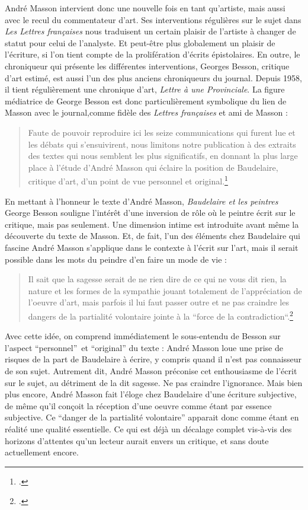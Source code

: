 	 André Masson intervient donc une nouvelle fois en tant qu’artiste, mais aussi avec le recul du commentateur d’art. Ses interventions régulières sur le sujet dans \emph{Les Lettres françaises} nous traduisent un certain plaisir de l’artiste à changer de statut pour celui de l’analyste. Et peut-être plus globalement un plaisir de l’écriture, si l’on tient compte de la prolifération d’écrits épistolaires. En outre, le chroniqueur qui présente les différentes interventions, Georges Besson, critique d’art estimé, est aussi l’un des plus anciens chroniqueurs du journal. Depuis 1958, il tient régulièrement une chronique d’art, \emph{Lettre à une Provinciale}. La figure médiatrice de George Besson est donc particulièrement symbolique du lien de Masson avec le journal,comme fidèle des \emph{Lettres françaises} et ami de Masson :
\begin{quote}
Faute de pouvoir reproduire ici les seize communications qui furent lue et les débats qui s’ensuivirent, nous limitons notre publication à des extraits des textes qui nous semblent les plus significatifs, en donnant la plus large place à l’étude d’André Masson qui éclaire la position de Baudelaire, critique d’art, d’un point de vue personnel et original.\footcite{baudelairepeintres}\end{quote}

	En mettant à l’honneur le texte d’André Masson, \emph{Baudelaire et les peintres} George Besson souligne l’intérêt d’une inversion de rôle où le peintre écrit sur le critique, mais pas seulement. Une dimension intime est introduite avant même la découverte du texte de Masson. Et, de fait, l’un des éléments chez Baudelaire qui fascine André Masson s’applique dans le contexte à l’écrit sur l’art, mais il serait possible dans les mots du peindre d’en faire un mode de vie : 
\begin{quote}
Il sait que la sagesse serait de ne rien dire de ce qui ne vous dit rien, la nature et les formes de la sympathie jouant totalement de l’appréciation de l’oeuvre d’art, mais parfois il lui faut passer outre et ne pas craindre les dangers de la partialité volontaire jointe à la “force de la contradiction“.\footcite{baudelairepeintres}\end{quote}

Avec cette idée, on comprend immédiatement le sous-entendu de Besson sur l’aspect \enquote{personnel} et \enquote{original} du texte : André Masson loue une prise de risques de la part de Baudelaire à écrire, y compris quand il n’est pas connaisseur de son sujet. Autrement dit, André Masson préconise cet enthousiasme de l’écrit sur le sujet, au détriment de la dit sagesse. Ne pas craindre l’ignorance. Mais bien plus encore, André Masson fait l’éloge chez Baudelaire d’une écriture subjective, de même qu’il conçoit la réception d’une oeuvre comme étant par essence subjective. Ce \enquote{danger de la partialité volontaire} apparait donc comme étant en réalité une qualité essentielle. Ce qui est déjà un décalage complet vis-à-vis des horizons d’attentes qu’un lecteur aurait envers un critique, et sans doute actuellement encore. 

